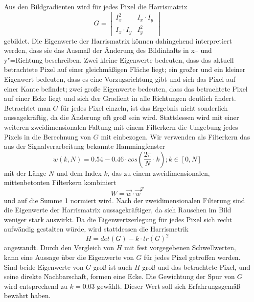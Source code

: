 Aus den Bildgradienten wird für jedes Pixel die Harrismatrix
\begin{equation}
	G = \begin{bmatrix}
		I_x^2 & I_x \cdot I_y\\
		I_x \cdot I_y & I_y^2
	\end{bmatrix}
\end{equation}
gebildet. Die Eigenwerte der Harrismatrix können dahingehend interpretiert werden, dass sie das Ausmaß der Änderung des Bildinhalts in x-- und y"=Richtung beschreiben. Zwei kleine Eigenwerte bedeuten, dass das aktuell betrachtete Pixel auf einer gleichmäßigen Fläche liegt; ein großer und ein kleiner Eigenwert bedeuten, dass es eine Vorzugsrichtung gibt und sich das Pixel auf einer Kante befindet; zwei große Eigenwerte bedeuten, dass das betrachtete Pixel auf einer Ecke liegt und sich der Gradient in alle Richtungen deutlich ändert. Betrachtet man $G$ für jedes Pixel einzeln, ist das Ergebnis nicht sonderlich aussagekräftig, da die Änderung oft groß sein wird. Stattdessen wird mit einer weiteren zweidimensionalen Faltung mit einem Filterkern die Umgebung jedes Pixels in die Berechnung von $G$ mit einbezogen. Wir verwenden als Filterkern das aus der Signalverarbeitung bekannte Hammingfenster
\begin{equation}
	w(k, N) = 0.54 - 0.46 \cdot cos(\dfrac{2\pi}{N} \cdot k); k \in [0, N]
\end{equation}
mit der Länge $N$ und dem Index $k$, das zu einem zweidimensionalen, mittenbetonten Filterkern kombiniert
\begin{equation}
	W = \vec{w} \cdot \vec{w}^T
\end{equation}
und auf die Summe 1 normiert wird. Nach der zweidimensionalen Filterung sind die Eigenwerte der Harrismatrix aussagekräftiger, da sich Rauschen im Bild weniger stark auswirkt. Da die Eigenwertzerlegung für jedes Pixel sich recht aufwändig gestalten würde, wird stattdessen die Harrismetrik
\begin{equation}
	H = det(G) - k \cdot tr(G)^2
\end{equation}
angewandt. Durch den Vergleich von $H$ mit fest vorgegebenen Schwellwerten, kann eine Aussage über die Eigenwerte von $G$ für jedes Pixel getroffen werden. Sind beide Eigenwerte von $G$ groß ist auch $H$ groß und das betrachtete Pixel, und seine direkte Nachbarschaft, formen eine Ecke. Die Gewichtung der Spur von $G$ wird entsprechend \cite[S. 378]{Ma} zu $k = 0.03$ gewählt. Dieser Wert soll sich Erfahrungsgemäß bewährt haben.

